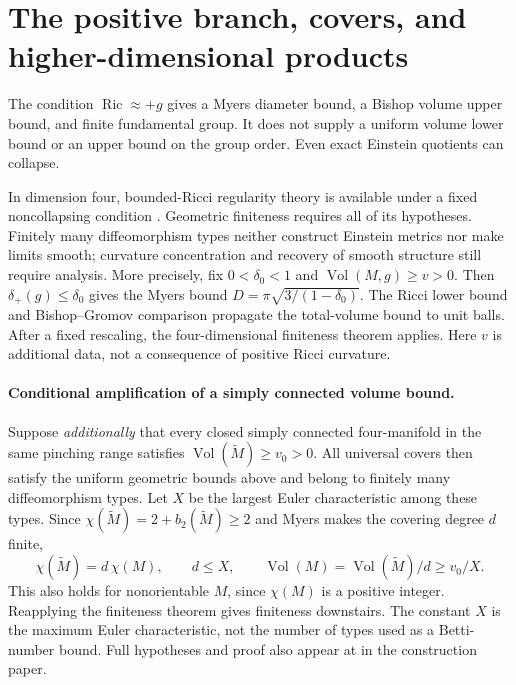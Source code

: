 \documentclass[a4paper,11pt]{article}
\numberwithin{equation}{section}
\theoremstyle{definition}
\newcommand{\Ric}{\operatorname{Ric}}
\newcommand{\Vol}{\operatorname{Vol}}
\begin{document}
\section{The positive branch, covers, and higher-dimensional products}\label{sec:positive-highdim}
The condition $\Ric\approx+g$ gives a Myers diameter bound, a Bishop volume upper bound, and finite fundamental group.
It does not supply a uniform volume lower bound or an upper bound on the group order.
Even exact Einstein quotients can collapse.

In dimension four, bounded-Ricci regularity theory is available under a fixed noncollapsing condition \cite{CN}.
Geometric finiteness requires all of its hypotheses. Finitely many diffeomorphism types neither construct Einstein metrics nor make limits smooth; curvature concentration and recovery of smooth structure still require analysis.
More precisely, fix $0<\delta_0<1$ and $\Vol(M,g)\ge v>0$.
Then $\delta_+(g)\le\delta_0$ gives the Myers bound $D=\pi\sqrt{3/(1-\delta_0)}$.
The Ricci lower bound and Bishop--Gromov comparison propagate the total-volume bound to unit balls.
After a fixed rescaling, the four-dimensional finiteness theorem \cite[Theorem 1.12]{CN} applies.
Here $v$ is additional data, not a consequence of positive Ricci curvature.

\paragraph{Conditional amplification of a simply connected volume bound.}\label{par:positive-cover-amplifier}
Suppose \emph{additionally} that every closed simply connected four-manifold in the same pinching range satisfies $\Vol(\widetilde M)\ge v_0>0$.
All universal covers then satisfy the uniform geometric bounds above and belong to finitely many diffeomorphism types.
Let $X$ be the largest Euler characteristic among these types.
Since $\chi(\widetilde M)=2+b_2(\widetilde M)\ge2$ and Myers makes the covering degree $d$ finite,
\begin{equation}\label{eq:positive-cover-volume}
 \chi(\widetilde M)=d\,\chi(M),\qquad
 d\le X,\qquad \Vol(M)=\Vol(\widetilde M)/d\ge v_0/X.
\end{equation}
This also holds for nonorientable $M$, since $\chi(M)$ is a positive integer.
Reapplying the finiteness theorem gives finiteness downstairs.
The constant $X$ is the maximum Euler characteristic, not the number of types used as a Betti-number bound.
Full hypotheses and proof also appear at  in the construction paper.
\end{document}
